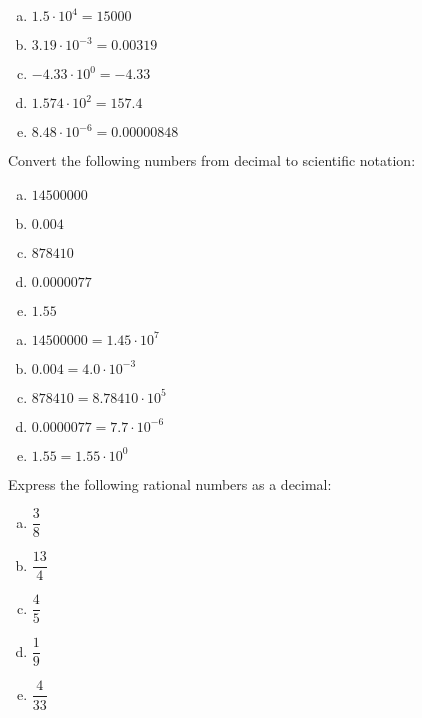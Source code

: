 \documentclass[11pt,letterpaper]{article}
\begin{document}
\sol
\begin{enumerate}[(a)]
\item $1.5 \cdot 10^4= 15000$
\item $3.19 \cdot 10^{-3}= 0.00319$
\item $-4.33 \cdot 10^0= -4.33$
\item $1.574 \cdot 10^2= 157.4$
\item $8.48 \cdot 10^{-6}= 0.00000848$
\end{enumerate}



\newpage



 Convert the following numbers from decimal to scientific notation:
\begin{enumerate}[(a)]
\item $14500000$
\item $0.004$
\item $878410$
\item $0.0000077$
\item $1.55$
\end{enumerate} \pspace

\sol
\begin{enumerate}[(a)]
\item $14500000= 1.45 \cdot 10^7$
\item $0.004= 4.0 \cdot 10^{-3}$
\item $878410= 8.78410 \cdot 10^5$
\item $0.0000077= 7.7 \cdot 10^{-6}$
\item $1.55= 1.55 \cdot 10^0$
\end{enumerate}



\newpage



 Express the following rational numbers as a decimal:
\begin{enumerate}[(a)]
\item $\dfrac{3}{8}$
\item $\dfrac{13}{4}$
\item $\dfrac{4}{5}$
\item $\dfrac{1}{9}$
\item $\dfrac{4}{33}$
\end{enumerate} \pspace
\end{document}
